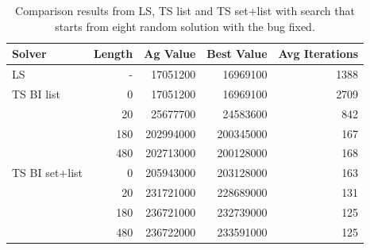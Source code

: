 	\begin{table}[]
		\centering
		\begin{tabular}{lrrrr}
			\toprule
			\textbf{Solver} & \textbf{Length} & \textbf{Ag Value} & \textbf{Best Value} & \textbf{Avg Iterations} \\
			\toprule
			LS              & -                                   & 17051200                              & 16969100                                & 1388                                        \\
			\midrule
			TS BI list      & 0                                   & 17051200                              & 16969100                                & 2709                                        \\
			& 20                                  & 25677700                              & 24583600                                & 842                                         \\
			& 180                                 & 202994000                             & 200345000                               & 167                                         \\
			& 480                                 & 202713000                             & 200128000                               & 168                                         \\
			\midrule
			TS BI set+list  & 0                                   & 205943000                             & 203128000                               & 163 \\
			& 20                                  & 231721000                             & 228689000                               & 131 \\
			& 180                                 & 236721000                             & 232739000                               & 125  \\
			& 480                                 & 236722000                             & 233591000                               & 125  \\
			\bottomrule
		\end{tabular}
		\caption{Comparison results from LS, TS list and TS set+list with search that starts from eight random solution with the bug fixed.}
		\label{tab:8initrnd_2}
	\end{table}
	

\newpage
		

